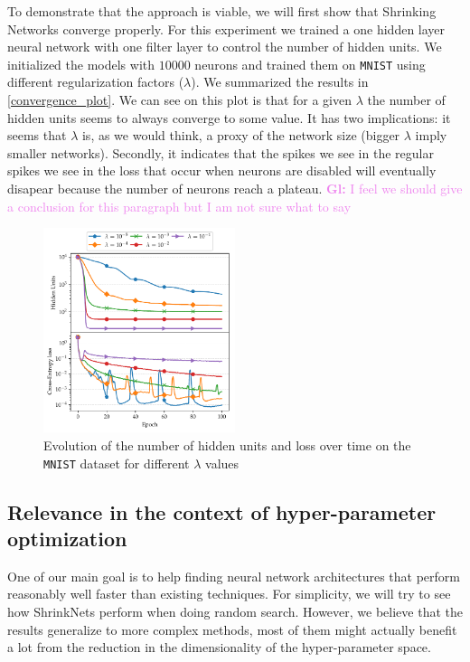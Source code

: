 \documentclass[sigconf]{acmart}
\newcommand{\gl}[1]{\textcolor{violet}{{\bf Gl:} #1}}
\begin{document}
To demonstrate that the approach is viable, we will first show that Shrinking
Networks converge properly. For this experiment we trained a one hidden layer
neural network with one filter layer to control the number of hidden units. We
initialized the models with $10000$ neurons and trained them on \texttt{MNIST}
using different regularization factors ($\lambda$). We summarized the results
in \autoref{convergence_plot}. We can see on this plot is that
for a given $\lambda$ the number of hidden units seems to always converge to
some value. It has two implications: it seems that $\lambda$ is, as we would think,
a proxy of the network size (bigger $\lambda$ imply smaller networks). Secondly,
it indicates that the spikes we see in the regular spikes we see in the loss that occur when neurons are disabled will eventually disapear because the number of neurons reach a plateau. \gl{I feel we should give a conclusion for this paragraph but
I am not sure what to say}
\begin{figure}
\begin{center}
\includegraphics[width=0.5\textwidth]{convergence}
\caption{Evolution of the number of hidden units and loss over time on the \texttt{MNIST} dataset for different $\lambda$ values \label{convergence_plot}}
\end{center}
\end{figure}


\subsection{Relevance in the context of hyper-parameter optimization}

One of our main goal is to help finding neural network architectures that
perform reasonably well faster than existing techniques. For simplicity,
we will try to see how ShrinkNets perform when doing random search. However,
we believe that the results generalize to more complex methods, most of them
might actually benefit a lot from the reduction in the dimensionality of the
hyper-parameter space.
\end{document}
